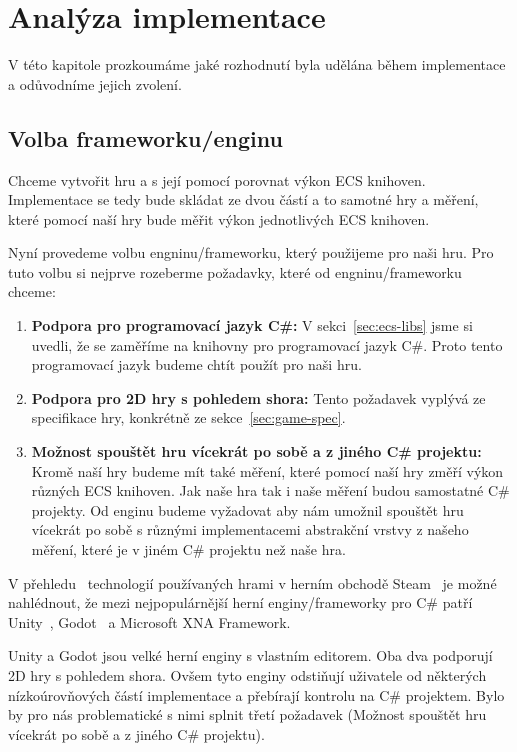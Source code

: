 \chapter{Analýza implementace}
V této kapitole prozkoumáme jaké rozhodnutí byla udělána během implementace a odůvodníme jejich zvolení.


\section{Volba frameworku/enginu}
Chceme vytvořit hru a s její pomocí porovnat výkon ECS knihoven. Implementace se tedy bude skládat ze dvou částí a to samotné hry a měření, které pomocí naší hry bude měřit výkon jednotlivých ECS knihoven.

Nyní provedeme volbu engninu/frameworku, který použijeme pro naši hru. Pro tuto volbu si nejprve rozeberme požadavky, které od engninu/frameworku chceme:

\begin{enumerate}
    \item \textbf{Podpora pro programovací jazyk C\#:} V sekci~\ref{sec:ecs-libs} jsme si uvedli, že se zaměříme na knihovny pro programovací jazyk C\#. Proto tento programovací jazyk budeme chtít použít pro naši hru.
    \item \textbf{Podpora pro 2D hry s pohledem shora:} Tento požadavek vyplývá ze specifikace hry, konkrétně ze sekce~\ref{sec:game-spec}.
    \item \textbf{Možnost spouštět hru vícekrát po sobě a z jiného C\# projektu:} Kromě naší hry budeme mít také měření, které pomocí naší hry změří výkon různých ECS knihoven. Jak naše hra tak i naše měření budou samostatné C\# projekty. Od enginu budeme vyžadovat aby nám umožnil spouštět hru vícekrát po sobě s různými implementacemi abstrakční vrstvy z našeho měření, které je v jiném C\# projektu než naše hra.    
\end{enumerate}

V přehledu~\cite{SteamDB} technologií používaných hrami v herním obchodě Steam~\cite{Steam} je možné nahlédnout, že mezi nejpopulárnější herní enginy/frameworky pro C\# patří Unity~\cite{Unity}, Godot~\cite{Godot} a Microsoft XNA Framework.

Unity a Godot jsou velké herní enginy s vlastním editorem. Oba dva podporují 2D hry s pohledem shora. Ovšem tyto enginy odstiňují uživatele od některých nízkoúrovňových částí implementace a přebírají kontrolu na C\# projektem. Bylo by pro nás problematické s nimi splnit třetí požadavek (Možnost spouštět hru vícekrát po sobě a z jiného C\# projektu).

